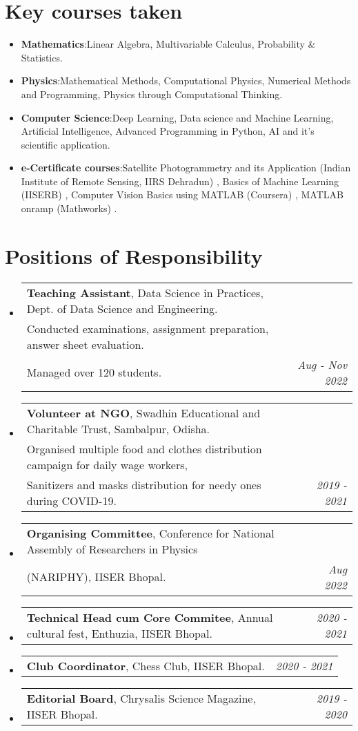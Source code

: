 \documentclass[a4paper,11pt]{article}
\makeatletter
\newcommand{\resumeItem}[2]{
  \item{
    \textbf{#1}{:\hspace{0.5mm}#2 \vspace{-0.5mm}}
  }
}
\newcommand{\resumePOR}[3]{
\vspace{0.5mm}\item
    \begin{tabular*}{0.97\textwidth}[t]{l@{\extracolsep{\fill}}r}
        \textbf{#1}, \hspace{0.3mm}#2 & \textit{\small{#3}} 
    \end{tabular*}
    \vspace{-2mm}
}
\newcommand{\resumeSubItem}[2]{\resumeItem{#1}{#2}\vspace{-4pt}}
\newcommand{\resumeSubHeadingListStart}{\begin{itemize}[leftmargin=*,labelsep=0mm]}
\newcommand{\resumeHeadingSkillStart}{\begin{itemize}[leftmargin=*,itemsep=1.7mm, rightmargin=2ex]}
\newcommand{\resumeSubHeadingListEnd}{\end{itemize}\vspace{2mm}}
\newcommand{\resumeHeadingSkillEnd}{\end{itemize}\vspace{-2mm}}
\makeatother
\begin{document}
\section{Key courses taken}
\resumeHeadingSkillStart
\resumeSubItem{Mathematics} %
    {Linear Algebra, Multivariable Calculus, Probability \& Statistics.}
\resumeSubItem{Physics} %
    {Mathematical Methods, Computational Physics, Numerical Methods and Programming, Physics through Computational Thinking.}
\resumeSubItem{Computer Science} %
    {Deep Learning, Data science and Machine Learning, Artificial Intelligence, Advanced Programming in Python, AI and it's scientific application.}
\resumeSubItem{e-Certificate courses} %
    {Satellite Photogrammetry and its Application (Indian Institute of Remote Sensing, IIRS Dehradun) \href{https://drive.google.com/file/d/1Va-hpY1TD7TdQ1_NzGwa9ggJ51vc5G4F/view?usp=share_link}{\footnotesize  \faIcon{link}}, Basics of Machine Learning (IISERB) \href{https://drive.google.com/file/d/1BFrfINnnO-heBwsiXnqa4u2_QSWYoIO0/view?usp=share_link}{\footnotesize  \faIcon{link}}, Computer Vision Basics using MATLAB (Coursera) \href{https://drive.google.com/file/d/1puteJJLp2zHHtByPVuY3wXHVIiDmp87M/view?usp=sharing}{\footnotesize \faIcon{link}}, MATLAB onramp (Mathworks) \href{https://drive.google.com/file/d/1-HQdhUhWTQ7qmyNNIMeb9y5ejI7DH3Uc/view?usp=share_link}{\footnotesize  \faIcon{link}}.}
\resumeHeadingSkillEnd

\section{Positions of Responsibility}
\vspace{-0.4mm}
\resumeSubHeadingListStart
\resumePOR{Teaching Assistant} %
    {Data Science in Practices, Dept. of Data Science and Engineering. \\
    Conducted examinations, assignment preparation, answer sheet evaluation. \\ Managed over 120 students.} %
    {Aug - Nov 2022} %
\resumePOR{Volunteer at NGO} %
    {Swadhin Educational and Charitable Trust, Sambalpur, Odisha. \\
    Organised multiple food and clothes distribution campaign for daily wage workers,\\
    Sanitizers and masks distribution for needy ones during COVID-19.} %
    {2019 - 2021} %
\resumePOR{Organising Committee} %
    {Conference for National Assembly of Researchers in Physics \\(NARIPHY), IISER Bhopal.} %
    {Aug 2022} %
\resumePOR{Technical Head cum Core Commitee} %
    {Annual cultural fest, Enthuzia, IISER Bhopal.} %
    {2020 - 2021} %
\resumePOR{Club Coordinator} %
    {Chess Club, IISER Bhopal.} %
    {2020 - 2021} %
\resumePOR{Editorial Board} %
    {Chrysalis Science Magazine, IISER Bhopal.} %
    {2019 - 2020} %
\resumeSubHeadingListEnd
\vspace{-4mm}
\end{document}
